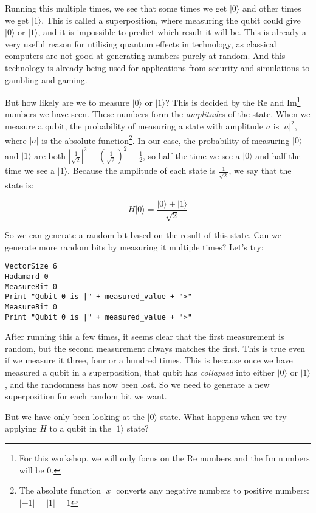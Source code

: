 \documentclass[twocolumn]{article}
\begin{document}
Running this multiple times, we see that some times we get $|0\rangle$ and other times we get $|1\rangle$. This is called a superposition, where measuring the qubit could give $|0\rangle$ or $|1\rangle$, and it is impossible to predict which result it will be. This is already a very useful reason for utilising quantum effects in technology, as classical computers are not good at generating numbers purely at random. And this technology is already being used for applications from security and simulations to gambling and gaming.

But how likely are we to measure $|0\rangle$ or $|1\rangle$? This is decided by the Re and Im\footnote{For this workshop, we will only focus on the Re numbers and the Im numbers will be $0$.} numbers we have seen. These numbers form the {\em amplitude}s of the state. When we measure a qubit, the probability of measuring a state with amplitude $a$ is $|a|^2$, where $|a|$ is the absolute function\footnote{The absolute function $|x|$ converts any negative numbers to positive numbers: $|-1| = |1| = 1$}. In our case, the probability of measuring $|0\rangle$ and $|1\rangle$ are both $|\frac{1}{\sqrt{2}}|^2 = (\frac{1}{\sqrt{2}})^2 = \frac{1}{2}$, so half the time we see a $|0\rangle$ and half the time we see a $|1\rangle$. Because the amplitude of each state is $\frac{1}{\sqrt{2}}$, we say that the state is:

$$H|0\rangle = \frac{|0\rangle + |1\rangle}{\sqrt{2}}$$

So we can generate a random bit based on the result of this state. Can we generate more random bits by measuring it multiple times? Let's try:

\begin{lstlisting}
VectorSize 6
Hadamard 0
MeasureBit 0
Print "Qubit 0 is |" + measured_value + ">"
MeasureBit 0
Print "Qubit 0 is |" + measured_value + ">"
\end{lstlisting}

After running this a few times, it seems clear that the first measurement is random, but the second measurement always matches the first. This is true even if we measure it three, four or a hundred times. This is because once we have measured a qubit in a superposition, that qubit has {\em collapsed} into either $|0\rangle$ or $|1\rangle$, and the randomness has now been lost. So we need to generate a new superposition for each random bit we want.

But we have only been looking at the $|0\rangle$ state. What happens when we try applying $H$ to a qubit in the $|1\rangle$ state?
\end{document}
